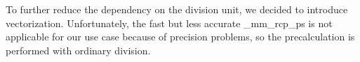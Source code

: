 To further reduce the dependency on the division unit, we decided to introduce vectorization.
Unfortunately, the fast but less accurate \_mm\_rcp\_ps is not applicable for our use case because of precision problems, so the precalculation is performed with ordinary division.




